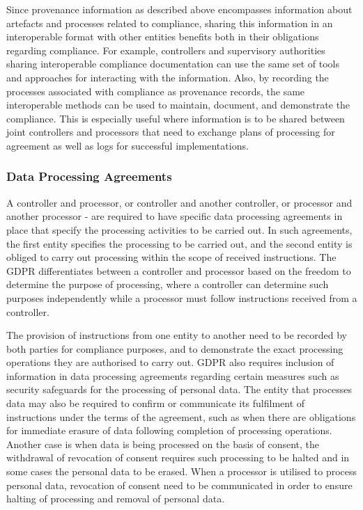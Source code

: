 Since provenance information as described above encompasses information about artefacts and processes related to compliance, sharing this information in an interoperable format with other entities benefits both in their obligations regarding compliance. For example, controllers  and supervisory authorities sharing interoperable compliance documentation can use the same set of tools and approaches for interacting with the information. Also, by recording the processes associated with compliance as provenance records, the same interoperable methods can be used to maintain, document, and demonstrate the compliance. This is especially useful where information is to be shared between joint controllers and processors that need to exchange plans of processing for agreement as well as logs for successful implementations.

\subsubsection{Data Processing Agreements}
A controller and processor, or controller and another controller, or processor and another processor - are required to have specific data processing agreements in place that specify the processing activities to be carried out. 
In such agreements, the first entity specifies the processing to be carried out, and the second entity is obliged to carry out processing within the scope of received instructions. The GDPR differentiates between a controller and processor based on the freedom to determine the purpose of processing, where a controller can determine such purposes independently while a processor must follow instructions received from a controller.

The provision of instructions from one entity to another need to be recorded by both parties for compliance purposes, and to demonstrate the exact processing operations they are authorised to carry out. GDPR also requires inclusion of information in data processing agreements regarding certain measures such as security safeguards for the processing of personal data. The entity that processes data may also be required to confirm or communicate its fulfilment of instructions under the terms of the agreement, such as when there are obligations for immediate erasure of data following completion of processing operations. Another case is when data is being processed on the basis of consent, the withdrawal of revocation of consent requires such processing to be halted and in some cases the personal data to be erased. When a processor is utilised to process personal data, revocation of consent need to be communicated in order to ensure halting of processing and removal of personal data.

